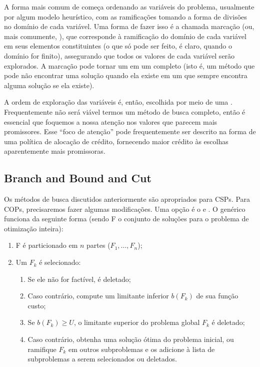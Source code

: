 A forma mais comum de  começa ordenando as variáveis do problema, usualmente
por algum modelo heurístico, com as ramificações tomando a forma de divisões no domínio de cada
variável. Uma forma de fazer isso é a chamada marcação (ou, mais comumente, ),
que corresponde à ramificação do domínio de cada variável em seus elementos constituintes (o que só
pode ser feito, é claro, quando o domínio for finito), assegurando que todos os valores de cada
variável
serão explorados. A marcação pode tornar um 
em um completo (isto é, um método que pode não encontrar uma solução quando ela existe em um que sempre encontra alguma solução se ela existe).

A ordem de exploração das variáveis é, então, escolhida por meio de uma . Frequentemente não será viável termos um método de busca completo, então é
essencial que foquemos a nossa atenção nos valores que parecem mais promissores. Esse ``foco de
atenção'' pode frequentemente ser descrito na forma de uma política de alocação de crédito,
fornecendo maior crédito às escolhas aparentemente mais promissoras.

\subsection{Branch and Bound and Cut}

Os métodos de busca discutidos anteriormente são apropriados para CSPs. Para COPs, precisaremos
fazer algumas modificações. Uma opção é o  e . O  genérico funciona da seguinte forma (sendo F o conjunto de
soluções para o problema de otimização inteira):

\begin{enumerate}
  \item F é particionado em $n$ partes ($F_1, \hdots, F_n$);
  \item Um $F_k$ é selecionado:
    \begin{enumerate}
      \item Se ele não for factível, é deletado;
      \item Caso contrário, compute um limitante inferior $b(F_k)$ de sua função custo;
      \item Se $b(F_k) \geq U$, o limitante superior do problema global $F_k$ é deletado;
      \item Caso contrário, obtenha uma solução ótima do problema inicial, ou ramifique $F_k$ em
        outros subproblemas e os adicione à lista de subproblemas a serem selecionados ou deletados.
    \end{enumerate}
  \end{enumerate}


